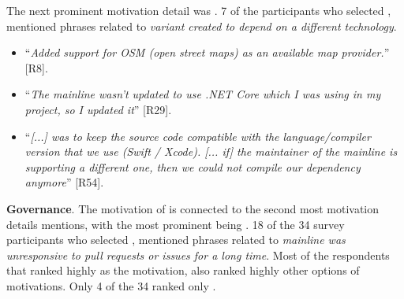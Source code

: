\nd The next prominent  motivation detail was .
7 of the participants who selected , mentioned phrases related to \emph{variant created to depend on a different technology}.

\begin{itemize}[leftmargin=*]
\item ``\emph{Added support for OSM (open street maps) as an available map provider.}'' [R8].
\item ``\emph{The mainline wasn't updated to use .NET Core which I was using in my project, so I updated it}'' [R29].
\item ``\emph{[...] was to keep the source code compatible with the language/compiler version that we use (Swift / Xcode). [... if] %
the maintainer of the mainline is supporting a different one, then we could not compile our dependency anymore}'' [R54].
\end{itemize}

\nd \textbf{Governance}. The motivation of  is connected to the second most motivation details mentions, with the most prominent being . 18 of the 34 survey participants who selected , mentioned phrases related to \emph{mainline was unresponsive to pull requests or issues for a long time}. Most of the respondents that ranked highly  as the motivation, also ranked highly other options of motivations. Only 4 of the 34 ranked only .


